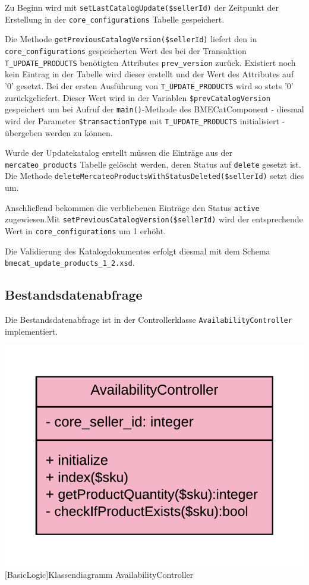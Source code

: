 	Zu Beginn wird mit \texttt{setLastCatalogUpdate(\$sellerId)} der Zeitpunkt der Erstellung in der \texttt{core\_configurations} Tabelle gespeichert.  
	
	Die Methode \texttt{getPreviousCatalogVersion(\$sellerId)} liefert den in \texttt{core\_configurations} gespeicherten Wert des bei der Transaktion \texttt{T\_UPDATE\_PRODUCTS} benötigten Attributes \texttt{prev\_version} zurück. Existiert noch kein Eintrag in der Tabelle wird dieser erstellt und der Wert des Attributes auf '0' gesetzt. Bei der ersten Ausführung von \texttt{T\_UPDATE\_PRODUCTS} wird so stets '0' zurückgeliefert. Dieser Wert wird in der Variablen \texttt{\$prevCatalogVersion} gespeichert um bei Aufruf der \texttt{main()}-Methode des BMECatComponent - diesmal wird der Parameter \texttt{\$transactionType} mit \texttt{T\_UPDATE\_PRODUCTS} initialisiert - übergeben werden zu können.
	
	Wurde der Updatekatalog erstellt müssen die Einträge aus der \texttt{mercateo\_products} Tabelle gelöscht werden, deren Status auf \texttt{delete} gesetzt ist. Die Methode \texttt{deleteMercateoProductsWithStatusDeleted(\$sellerId)} setzt dies um.
	
	Anschließend bekommen die verbliebenen Einträge den Status \texttt{active} zugewiesen.Mit \texttt{setPreviousCatalogVersion(\$sellerId)} wird der entsprechende Wert in \texttt{core\_configurations} um 1 erhöht.
	
	Die Validierung des Katalogdokumentes erfolgt diesmal mit dem Schema \texttt{bmecat\_update\_products\_1\_2.xsd}.
	
	\subsection{Bestandsdatenabfrage}
	
	Die Bestandsdatenabfrage ist in der Controllerklasse \texttt{AvailabilityController} implementiert.
	
	\begin{minipage}{\linewidth}
		\vspace{1em}
		\centering
		\includegraphics[width=0.4 \linewidth]{img/AvailabilityController}
		[BasicLogic]{Klassendiagramm AvailabilityController}
		\vspace{1em}
	\end{minipage}
	
